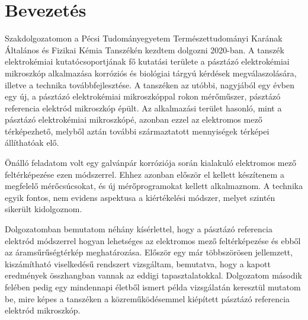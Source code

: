 \chapter{Bevezetés}
\pagestyle{headings}

Szakdolgozatomon a Pécsi Tudományegyetem Természettudományi Karának Általános és Fizikai Kémia Tanszékén kezdtem dolgozni 2020-ban. A tanszék elektrokémiai kutatócsoportjának fő kutatási területe a pásztázó elektrokémiai mikroszkóp alkalmazása korróziós és biológiai tárgyú kérdések megválaszolására, illetve a technika továbbfejlesztése. A tanszéken az utóbbi, nagyjából egy évben egy új, a pásztázó elektrokémiai mikroszkóppal rokon mérőműszer, pásztázó referencia elektród mikroszkóp épült. Az alkalmazási terület hasonló, mint a pásztázó elektrokémiai mikroszkópé, azonban ezzel az elektromos mező térképezhető, melyből aztán további származtatott mennyiségek térképei állíthatóak elő. 

Önálló feladatom volt egy galvánpár korróziója során kialakuló elektromos mező feltérképezése ezen módszerrel. Ehhez azonban először el kellett készítenem a megfelelő mérőcsúcsokat, és új mérőprogramokat kellett alkalmaznom. A technika egyik fontos, nem evidens aspektusa a kiértékelési módszer, melyet szintén sikerült kidolgoznom. 

Dolgozatomban bemutatom néhány kísérlettel, hogy a pásztázó referencia elektród módszerrel hogyan lehetséges az elektromos mező feltérképezése és ebből az áramsűrűségtérkép meghatározása. Először egy már többszörösen jellemzett, kiszámítható viselkedésű rendszert vizsgáltam, bemutatva, hogy a kapott eredmények összhangban vannak az eddigi tapasztalatokkal. Dolgozatom második felében pedig egy mindennapi életből ismert példa vizsgálatán keresztül mutatom be, mire képes a tanszéken a közreműködésemmel kiépített pásztázó referencia elektród mikroszkóp.
